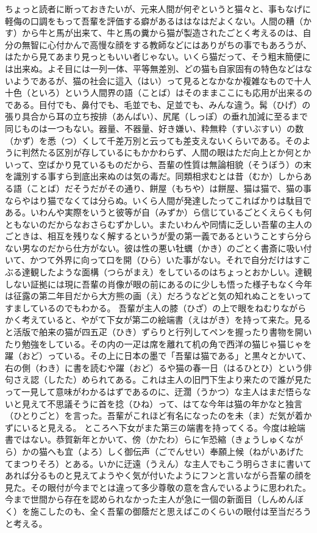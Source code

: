 \documentclass{book}
\begin{document}
ちょっと読者に断っておきたいが、元来人間が何ぞというと猫々と、事もなげに軽侮の口調をもって吾輩を評価する癖があるははなはだよくない。人間の糟（かす）から牛と馬が出来て、牛と馬の糞から猫が製造されたごとく考えるのは、自分の無智に心付かんで高慢な顔をする教師などにはありがちの事でもあろうが、はたから見てあまり見っともいい者じゃない。いくら猫だって、そう粗末簡便には出来ぬ。よそ目には一列一体、平等無差別、どの猫も自家固有の特色などはないようであるが、猫の社会に這入（はい）って見るとなかなか複雑なもので十人十色（といろ）という人間界の語（ことば）はそのままここにも応用が出来るのである。目付でも、鼻付でも、毛並でも、足並でも、みんな違う。髯（ひげ）の張り具合から耳の立ち按排（あんばい）、尻尾（しっぽ）の垂れ加減に至るまで同じものは一つもない。器量、不器量、好き嫌い、粋無粋（すいぶすい）の数（かず）を悉（つ）くして千差万別と云っても差支えないくらいである。そのように判然たる区別が存しているにもかかわらず、人間の眼はただ向上とか何とかいって、空ばかり見ているものだから、吾輩の性質は無論相貌（そうぼう）の末を識別する事すら到底出来ぬのは気の毒だ。同類相求むとは昔（むか）しからある語（ことば）だそうだがその通り、餅屋（もちや）は餅屋、猫は猫で、猫の事ならやはり猫でなくては分らぬ。いくら人間が発達したってこればかりは駄目である。いわんや実際をいうと彼等が自（みずか）ら信じているごとくえらくも何ともないのだからなおさらむずかしい。またいわんや同情に乏しい吾輩の主人のごときは、相互を残りなく解するというが愛の第一義であるということすら分らない男なのだから仕方がない。彼は性の悪い牡蠣（かき）のごとく書斎に吸い付いて、かつて外界に向って口を開（ひら）いた事がない。それで自分だけはすこぶる達観したような面構（つらがまえ）をしているのはちょっとおかしい。達観しない証拠には現に吾輩の肖像が眼の前にあるのに少しも悟った様子もなく今年は征露の第二年目だから大方熊の画（え）だろうなどと気の知れぬことをいってすましているのでもわかる。
吾輩が主人の膝（ひざ）の上で眼をねむりながらかく考えていると、やがて下女が第二の絵端書（えはがき）を持って来た。見ると活版で舶来の猫が四五疋（ひき）ずらりと行列してペンを握ったり書物を開いたり勉強をしている。その内の一疋は席を離れて机の角で西洋の猫じゃ猫じゃを躍（おど）っている。その上に日本の墨で「吾輩は猫である」と黒々とかいて、右の側（わき）に書を読むや躍（おど）るや猫の春一日（はるひとひ）という俳句さえ認（したた）められてある。これは主人の旧門下生より来たので誰が見たって一見して意味がわかるはずであるのに、迂濶（うかつ）な主人はまだ悟らないと見えて不思議そうに首を捻（ひね）って、はてな今年は猫の年かなと独言（ひとりごと）を言った。吾輩がこれほど有名になったのを未（ま）だ気が着かずにいると見える。
ところへ下女がまた第三の端書を持ってくる。今度は絵端書ではない。恭賀新年とかいて、傍（かたわ）らに乍恐縮（きょうしゅくながら）かの猫へも宜（よろ）しく御伝声（ごでんせい）奉願上候（ねがいあげたてまつりそろ）とある。いかに迂遠（うえん）な主人でもこう明らさまに書いてあれば分るものと見えてようやく気が付いたようにフンと言いながら吾輩の顔を見た。その眼付が今までとは違って多少尊敬の意を含んでいるように思われた。今まで世間から存在を認められなかった主人が急に一個の新面目（しんめんぼく）を施こしたのも、全く吾輩の御蔭だと思えばこのくらいの眼付は至当だろうと考える。
\end{document}
